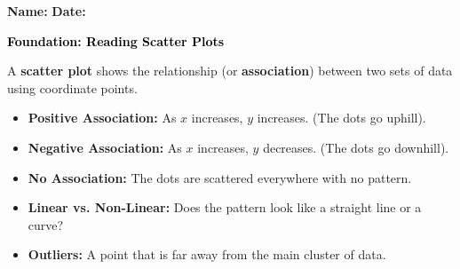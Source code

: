 \documentclass[12pt, letterpaper, fleqn]{article}
\begin{document}
\textbf{Name:} \underline{\hspace{5cm}}
\hfill
\textbf{Date:} \underline{\hspace{3cm}}\\

\begin{tcolorbox}[colback=customteal!20]
    \large\textcolor{black}{\textbf{Foundation: Reading Scatter Plots}}
\end{tcolorbox}

\vspace{3mm}

\noindent
A \textbf{scatter plot} shows the relationship (or \textbf{association}) between two sets of data using coordinate points. 

\begin{itemize}
    \item \textbf{Positive Association:} As $x$ increases, $y$ increases. (The dots go uphill).
    \item \textbf{Negative Association:} As $x$ increases, $y$ decreases. (The dots go downhill).
    \item \textbf{No Association:} The dots are scattered everywhere with no pattern.
    \item \textbf{Linear vs. Non-Linear:} Does the pattern look like a straight line or a curve?
    \item \textbf{Outliers:} A point that is far away from the main cluster of data.
\end{itemize}

\vspace{4mm}
\end{document}
